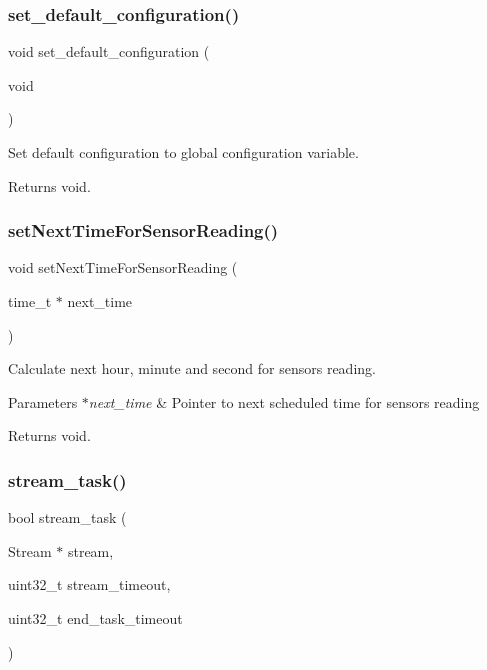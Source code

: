 \subsubsection{\texorpdfstring{set\+\_\+default\+\_\+configuration()}{set\_default\_configuration()}}
{\footnotesize\ttfamily void set\+\_\+default\+\_\+configuration (\begin{DoxyParamCaption}\item[{void}]{ }\end{DoxyParamCaption})}



Set default configuration to global configuration variable. 

\begin{DoxyReturn}{Returns}
void. 
\end{DoxyReturn}
\mbox{\label{rmap_8ino_a1686e2719fa4a37ef933458673973d28}} 
\subsubsection{\texorpdfstring{set\+Next\+Time\+For\+Sensor\+Reading()}{setNextTimeForSensorReading()}}
{\footnotesize\ttfamily void set\+Next\+Time\+For\+Sensor\+Reading (\begin{DoxyParamCaption}\item[{time\+\_\+t $\ast$}]{next\+\_\+time }\end{DoxyParamCaption})}



Calculate next hour, minute and second for sensors reading. 


\begin{DoxyParams}{Parameters}
{\em $\ast$next\+\_\+time} & Pointer to next scheduled time for sensors reading \\
\hline
\end{DoxyParams}
\begin{DoxyReturn}{Returns}
void. 
\end{DoxyReturn}
\mbox{\label{rmap_8ino_a21575354e8ec54fa31f581ed1838be79}} 
\subsubsection{\texorpdfstring{stream\+\_\+task()}{stream\_task()}}
{\footnotesize\ttfamily bool stream\+\_\+task (\begin{DoxyParamCaption}\item[{Stream $\ast$}]{stream,  }\item[{uint32\+\_\+t}]{stream\+\_\+timeout,  }\item[{uint32\+\_\+t}]{end\+\_\+task\+\_\+timeout }\end{DoxyParamCaption})}



